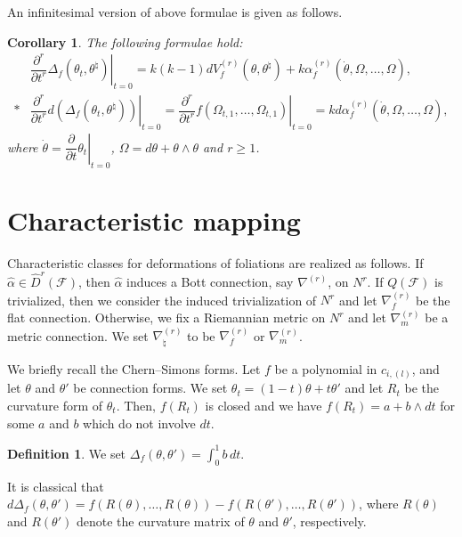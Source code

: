 \documentclass[12pt]{amsart}
\newcommand{\CF}{{\mathcal F}}
\newcommand{\pdif}[2]{\dfrac{\partial#1}{\partial#2}}
\newtheorem{corollary}[theorem]{Corollary}
\theoremstyle{definition}
\newtheorem{definition}[theorem]{Definition}
\theoremstyle{remark}
\begin{document}
An infinitesimal version of above formulae is given as follows.

\begin{corollary}
\label{cor6.5}
The following formulae hold\textup{:}
\begin{align*}
&\left.\dfrac{\partial^r}{\partial t^r}\Delta_f(\theta_t,\theta^\natural)\right|_{t=0}=k(k-1)dV_f^{(r)}(\theta,\theta^\natural)+k\alpha_f^{(r)}(\dot{\theta},\Omega,\ldots,\Omega),\\*
&\left.\dfrac{\partial^r}{\partial t^r}d(\Delta_f(\theta_t,\theta^\natural))\right|_{t=0}=\left.\dfrac{\partial^r}{\partial t^r}f(\Omega_{t,1},\ldots,\Omega_{t,1})\right|_{t=0}=kd\alpha_f^{(r)}(\dot\theta,\Omega,\ldots,\Omega),
\end{align*}
where $\dot\theta=\left.\pdif{}{t}\theta_t\right|_{t=0}$, $\Omega=d\theta+\theta\wedge\theta$ and $r\geq1$.
\end{corollary}

\section{Characteristic mapping}
Characteristic classes for deformations of foliations are realized as follows.
If $\widehat\alpha\in\widehat{D}^r(\CF)$, then $\widehat\alpha$ induces a Bott connection, say $\nabla^{(r)}$, on $N^r$.
If $Q(\CF)$ is trivialized, then we consider the induced trivialization of $N^r$ and let $\nabla_f^{(r)}$ be the flat connection.
Otherwise, we fix a Riemannian metric on $N^r$ and let $\nabla_m^{(r)}$ be a metric connection.
We set $\nabla_\natural^{(r)}$ to be $\nabla_f^{(r)}$ or $\nabla_m^{(r)}$.

We briefly recall the Chern--Simons forms.
Let $f$ be a polynomial in $c_{i,(l)}$, and let $\theta$ and $\theta'$ be connection forms.
We set $\theta_t=(1-t)\theta+t\theta'$ and let $R_t$ be the curvature form of $\theta_t$.
Then, $f(R_t)$ is closed and we have $f(R_t)=a+b\wedge dt$ for some $a$ and $b$ which do not involve $dt$.

\begin{definition}
We set $\Delta_f(\theta,\theta')=\int_0^1b\,dt$.
\end{definition}
It is classical that $d\Delta_f(\theta,\theta')=f(R(\theta),\ldots,R(\theta))-f(R(\theta'),\ldots,R(\theta'))$, where $R(\theta)$ and $R(\theta')$ denote the curvature matrix of $\theta$ and $\theta'$, respectively.
\end{document}
